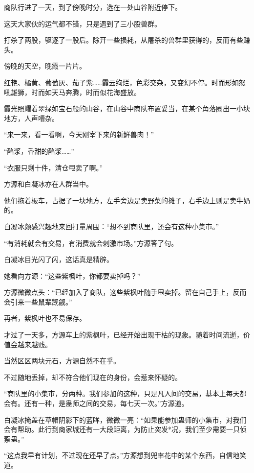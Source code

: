 
\begin{this_body}

商队行进了一天，到了傍晚时分，选在一处山谷附近停下。

这天大家伙的运气都不错，只是遇到了三小股兽群。

打杀了两股，驱逐了一股后。除开一些损耗，从屠杀的兽群里获得的，反而有些赚头。

傍晚的天空，晚霞一片片。

红艳、橘黄、葡萄灰、茄子紫……霞云绚烂，色彩交杂，又变幻不停。时而形如怒吼雄狮，时而如天马奔腾，时而似花海盛放。

霞光照耀着翠绿如宝石般的山谷，在山谷中商队布置妥当，在某个角落圈出一小块地方，人声嘈杂。

“来一来，看一看啊，今天刚宰下来的新鲜兽肉！”

“酪浆，香甜的酪浆……”

“衣服只剩十件，清仓甩卖了啊。”

方源和白凝冰亦在人群当中。

他们拖着板车，占据了一块地方，左手旁边是卖野菜的摊子，右手边上则是卖牛奶的。

白凝冰颇感兴趣地来回打量周围：“想不到商队里，还会有这种小集市。”

“有消耗就会有交易，有消费就会刺激市场。”方源答了句。

白凝冰目光闪了闪，这话真是精辟。

她看向方源：“这些紫枫叶，你都要卖掉吗？”

方源微微点头：“已经加入了商队，这些紫枫叶随手甩卖掉。留在自己手上，反而会引来一些鼠辈觊觎。”

再者，紫枫叶也不易保存。

才过了一天多，方源车上的紫枫叶，已经开始出现干枯的现象。随着时间流逝，价值会越来越贱。

当然区区两块元石，方源自然不在乎。

不过随地丢掉，却不符合他们现在的身份，会惹来怀疑的。

“商队里的小集市，分两种。我们参加的这种，只是凡人间的交易，基本上每天都会有。还有一种，是蛊师之间的交易，每七天一次。”方源道。

白凝冰掩盖在草帽阴影下的蓝眸，微微一亮：“如果能参加蛊师的小集市，对我们会有帮助。此行到商家城还有一大段距离，为防止突发*况，我们至少需要一只侦察蛊。”

“这点我早有计划，不过现在还早了点。”方源想到兜率花中的某个东西，自信地笑道。


\end{this_body}
